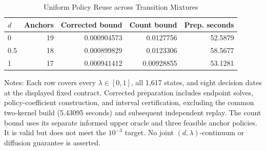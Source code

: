 \begin{table}[!htbp]
\centering\small
\caption{Uniform Policy Reuse across Transition Mixtures}
\label{tab:r6_kernel}
\begin{tabular}{lrrrr}
\toprule
$d$ & Anchors & Corrected bound & Count bound & Prep. seconds \\
\midrule
0 & 19 & 0.000904573 & 0.0127756 & 52.5879 \\
0.5 & 18 & 0.000899829 & 0.0123306 & 58.5677 \\
1 & 17 & 0.000941412 & 0.00928855 & 53.1281 \\
\bottomrule
\end{tabular}
\par\smallskip
\begin{minipage}{0.98\linewidth}\footnotesize
Notes: Each row covers every $\lambda\in[0,1]$, all 1,617 states, and eight decision dates at the displayed fixed contract. Corrected preparation includes endpoint solves, policy-coefficient construction, and interval certification, excluding the common two-kernel build (5.43095 seconds) and subsequent independent replay. The count bound uses its separate informed upper oracle and three feasible anchor policies. It is valid but does not meet the $10^{-3}$ target. No joint $(d,\lambda)$-continuum or diffusion guarantee is asserted.
\end{minipage}
\end{table}
